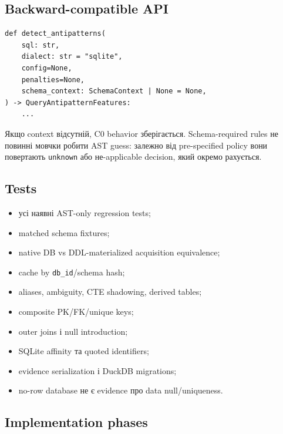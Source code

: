 \documentclass[11pt,a4paper]{article}
\newcommand{\unknown}{\texttt{unknown}}
\begin{document}
\subsection{Backward-compatible API}

\begin{lstlisting}[style=pythonstyle]
def detect_antipatterns(
    sql: str,
    dialect: str = "sqlite",
    config=None,
    penalties=None,
    schema_context: SchemaContext | None = None,
) -> QueryAntipatternFeatures:
    ...
\end{lstlisting}

Якщо context відсутній, C0 behavior зберігається. Schema-required rules не повинні
мовчки робити AST guess: залежно від pre-specified policy вони повертають \unknown
або не-applicable decision, який окремо рахується.

\subsection{Tests}

\begin{itemize}
\item усі наявні AST-only regression tests;
\item matched schema fixtures;
\item native DB vs DDL-materialized acquisition equivalence;
\item cache by \texttt{db\_id}/schema hash;
\item aliases, ambiguity, CTE shadowing, derived tables;
\item composite PK/FK/unique keys;
\item outer joins і null introduction;
\item SQLite affinity та quoted identifiers;
\item evidence serialization і DuckDB migrations;
\item no-row database не є evidence про data null/uniqueness.
\end{itemize}

\subsection{Implementation phases}
\end{document}
